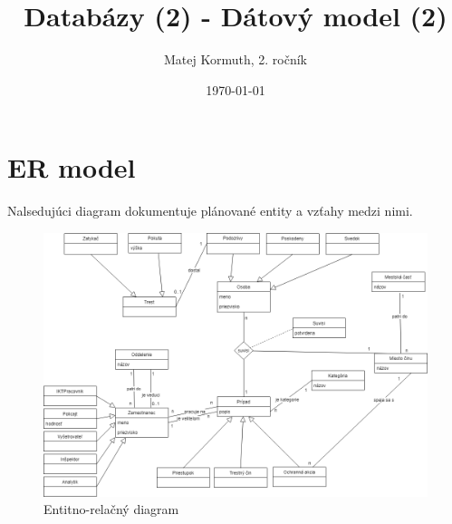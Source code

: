 \documentclass[11pt,a4paper]{article}
\begin{document}
    \title{Databázy (2) - Dátový model (2)}
    \author{Matej Kormuth, 2. ročník}
    \date{\today}

    \begin{titlingpage}
        \renewcommand\maketitlehooka{\null\mbox{}\vfill}
        \renewcommand\maketitlehookd{\vfill\null}
        \maketitle
    \end{titlingpage}

    \section*{ER model}

    Nalsedujúci diagram dokumentuje plánované entity a vzťahy medzi nimi.

    \begin{figure}[h]
        \centering
        \includegraphics[width=\textwidth]{model2.png}
        \caption{Entitno-relačný diagram}
        \label{fig:my_label}
    \end{figure}
\end{document}
